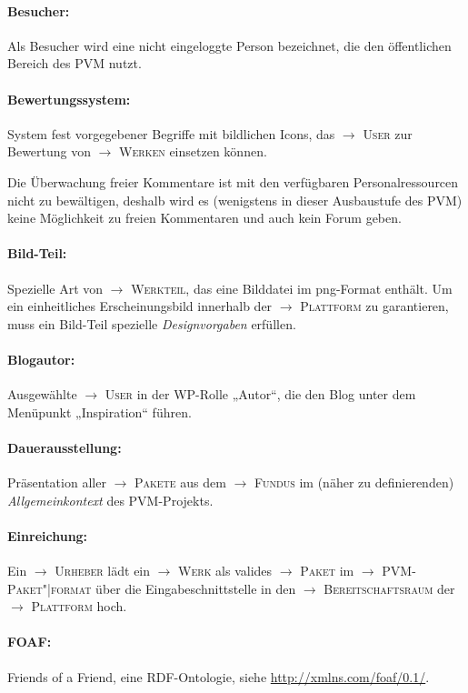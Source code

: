\documentclass[a4paper,11pt]{article}
\newcommand{\glossar}[1]{{$\to$ \textsc{#1}}}
\begin{document}
\paragraph{Besucher:} 
Als Besucher wird eine nicht eingeloggte Person bezeichnet, die den
öffentlichen Bereich des PVM nutzt.

\paragraph{Bewertungssystem:} 
System fest vorgegebener Begriffe mit bildlichen Icons, das \glossar{User} zur
Bewertung von \glossar{Werken} einsetzen können.

Die Überwachung freier Kommentare ist mit den verfügbaren Personalressourcen
nicht zu bewältigen, deshalb wird es (wenigstens in dieser Ausbaustufe des PVM)
keine Möglichkeit zu freien Kommentaren und auch kein Forum geben.  

\paragraph{Bild-Teil:}
Spezielle Art von \glossar{Werkteil}, das eine Bilddatei im png-Format enthält.
Um ein einheitliches Erscheinungsbild innerhalb der \glossar{Plattform} zu
garantieren, muss ein Bild-Teil spezielle \emph{Designvorgaben} erfüllen.

\paragraph{Blogautor:} 
Ausgewählte \glossar{User} in der WP-Rolle „Autor“, die den Blog unter dem
Menüpunkt „Inspiration“ führen. 

\paragraph{Dauerausstellung:} 
Präsentation aller \glossar{Pakete} aus dem \glossar{Fundus} im (näher zu
definierenden) \emph{Allgemeinkontext} des PVM-Projekts.

\paragraph{Einreichung:} 
Ein \glossar{Urheber} lädt ein \glossar{Werk} als valides \glossar{Paket} im
\glossar{PVM-Paket"|format} über die Eingabeschnittstelle in den
\glossar{Bereitschaftsraum} der \glossar{Plattform} hoch.

\paragraph{FOAF:} 
Friends of a Friend, eine RDF-Ontologie, siehe
\url{http://xmlns.com/foaf/0.1/}.
\end{document}

